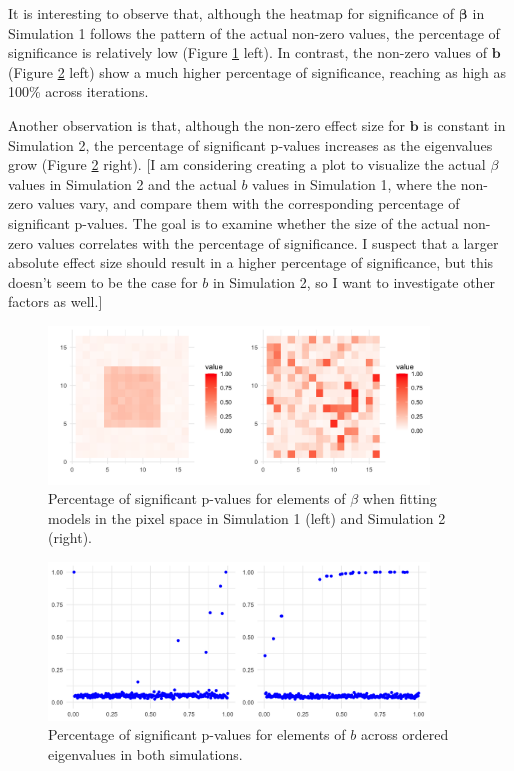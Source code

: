 \documentclass[12pt]{article}
\begin{document}
It is interesting to observe that, although the heatmap for significance of \( \boldsymbol{\beta} \) in Simulation 1 follows the pattern of the actual non-zero values, the percentage of significance is relatively low (Figure \ref{fig:perc_sign_beta} left). In contrast, the non-zero values of \( \mathbf{b} \) (Figure \ref{fig:perc_sign_b} left) show a much higher percentage of significance, reaching as high as 100\% across iterations.

Another observation is that, although the non-zero effect size for \( \mathbf{b} \) is constant in Simulation 2, the percentage of significant p-values increases as the eigenvalues grow (Figure \ref{fig:perc_sign_b} right). [I am considering creating a plot to visualize the actual \( \beta \) values in Simulation 2 and the actual \( b \) values in Simulation 1, where the non-zero values vary, and compare them with the corresponding percentage of significant p-values. The goal is to examine whether the size of the actual non-zero values correlates with the percentage of significance. I suspect that a larger absolute effect size should result in a higher percentage of significance, but this doesn’t seem to be the case for \( b \) in Simulation 2, so I want to investigate other factors as well.]

\begin{figure}[h!]
	\centering
	\includegraphics[width=0.9\textwidth]{perc_sign_pvals_hdi_beta.png}
	\caption{Percentage of significant p-values for elements of \( \beta \) when fitting models in the pixel space in
		Simulation 1 (left) and Simulation 2 (right).}
	\label{fig:perc_sign_beta}
\end{figure}

\begin{figure}[h!]
	\centering
	\includegraphics[width=0.9\textwidth]{perc_sign_pvals_hdi_b.png}
	\caption{Percentage of significant p-values for elements of \( b \) across ordered eigenvalues in both simulations.}
	\label{fig:perc_sign_b}
\end{figure}
\end{document}
